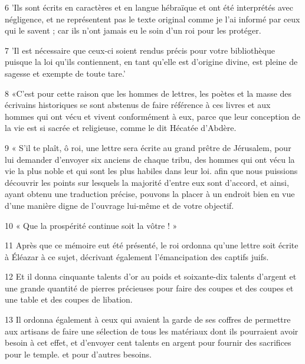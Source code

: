 \par 6 'Ils sont écrits en caractères et en langue hébraïque et ont été interprétés avec négligence, et ne représentent pas le texte original comme je l'ai informé par ceux qui le savent ; car ils n'ont jamais eu le soin d'un roi pour les protéger.

\par 7 'Il est nécessaire que ceux-ci soient rendus précis pour votre bibliothèque puisque la loi qu'ils contiennent, en tant qu'elle est d'origine divine, est pleine de sagesse et exempte de toute tare.'

\par 8 «C'est pour cette raison que les hommes de lettres, les poètes et la masse des écrivains historiques se sont abstenus de faire référence à ces livres et aux hommes qui ont vécu et vivent conformément à eux, parce que leur conception de la vie est si sacrée et religieuse, comme le dit Hécatée d'Abdère.

\par 9 « S'il te plaît, ô roi, une lettre sera écrite au grand prêtre de Jérusalem, pour lui demander d'envoyer six anciens de chaque tribu, des hommes qui ont vécu la vie la plus noble et qui sont les plus habiles dans leur loi. afin que nous puissions découvrir les points sur lesquels la majorité d'entre eux sont d'accord, et ainsi, ayant obtenu une traduction précise, pouvons la placer à un endroit bien en vue d'une manière digne de l'ouvrage lui-même et de votre objectif.

\par 10 « Que la prospérité continue soit la vôtre ! »

\par 11 Après que ce mémoire eut été présenté, le roi ordonna qu'une lettre soit écrite à Éléazar à ce sujet, décrivant également l'émancipation des captifs juifs.

\par 12 Et il donna cinquante talents d'or au poids et soixante-dix talents d'argent et une grande quantité de pierres précieuses pour faire des coupes et des coupes et une table et des coupes de libation.

\par 13 Il ordonna également à ceux qui avaient la garde de ses coffres de permettre aux artisans de faire une sélection de tous les matériaux dont ils pourraient avoir besoin à cet effet, et d'envoyer cent talents en argent pour fournir des sacrifices pour le temple. et pour d'autres besoins.

